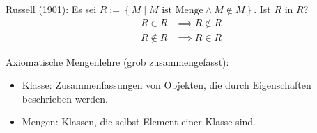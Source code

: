 \begin{remark}
Russell (1901): Es sei $R := \left\{ M \middle| M \text{ ist Menge} \wedge M \not\in M \right\}$. Ist $R$ in $R$?
\begin{align*}
  R \in R &\implies R \not\in R \\
  R \not\in R &\implies R \in R
\end{align*}

Axiomatische Mengenlehre (grob zusammengefasst):
\begin{itemize}
\item Klasse: Zusammenfassungen von Objekten, die durch Eigenschaften beschrieben werden.
\item Mengen: Klassen, die selbst Element einer Klasse sind.
\end{itemize}
\end{remark}